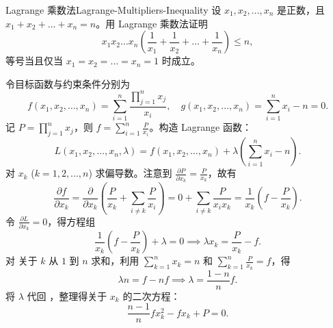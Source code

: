 \begin{problem}{Lagrange 乘数法}{Lagrange-Multipliers-Inequality}
    设 $x_1, x_2, \dots, x_n$ 是正数，且 $x_1 + x_2 + \dots + x_n = n$。用 Lagrange 乘数法证明
    \begin{equation}
        x_1 x_2 \dots x_n \left( \frac{1}{x_1} + \frac{1}{x_2} + \dots + \frac{1}{x_n} \right) \leqslant n,
    \end{equation}
    等号当且仅当 $x_1 = x_2 = \dots = x_n = 1$ 时成立。
\end{problem}

\begin{myproof}

    令目标函数与约束条件分别为
    \begin{equation}
        f(x_1, x_2, \dots, x_n) = \sum_{i=1}^n \frac{\prod_{j=1}^n x_j}{x_i}, \quad g(x_1, x_2, \dots, x_n) = \sum_{i=1}^n x_i - n = 0.
    \end{equation}
    记 $P = \prod_{j=1}^n x_j$，则 $f = \sum_{i=1}^n \frac{P}{x_i}$。构造 Lagrange 函数：
    \begin{equation}
        L(x_1, x_2, \dots, x_n, \lambda) = f(x_1, x_2, \dots, x_n) + \lambda \left( \sum_{i=1}^n x_i - n \right).
    \end{equation}
    对 $x_k$ ($k = 1, 2, \dots, n$) 求偏导数。注意到 $\frac{\partial P}{\partial x_k} = \frac{P}{x_k}$，故有
    \begin{equation}\label{eq:partial-f}
        \frac{\partial f}{\partial x_k} = \frac{\partial}{\partial x_k} \left( \frac{P}{x_k} + \sum_{i \neq k} \frac{P}{x_i} \right) = 0 + \sum_{i \neq k} \frac{P}{x_i x_k} = \frac{1}{x_k} \left( f - \frac{P}{x_k} \right).
    \end{equation}
    令 $\frac{\partial L}{\partial x_k} = 0$，得方程组
    \begin{equation}\label{eq:stationary-cond}
        \frac{1}{x_k} \left( f - \frac{P}{x_k} \right) + \lambda = 0 \implies \lambda x_k = \frac{P}{x_k} - f.
    \end{equation}
    对  关于 $k$ 从 $1$ 到 $n$ 求和，利用 $\sum_{k=1}^n x_k = n$ 和 $\sum_{k=1}^n \frac{P}{x_k} = f$，得
    \begin{equation}
        \lambda n = f - nf \implies \lambda = \frac{1-n}{n} f.
    \end{equation}
    将 $\lambda$ 代回 ，整理得关于 $x_k$ 的二次方程：
    \begin{equation}\label{eq:quadratic-res}
        \frac{n-1}{n} f x_k^2 - f x_k + P = 0.

\end{equation}
\end{myproof}
